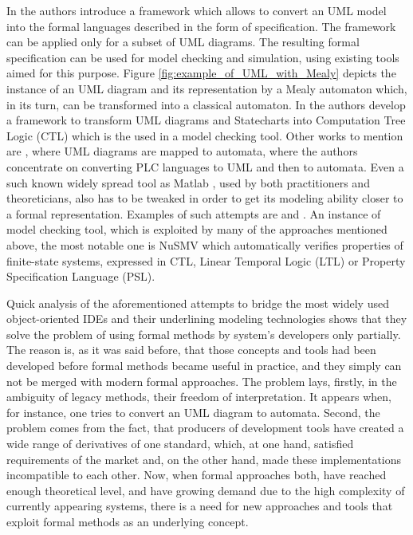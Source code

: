 In \cite{mcumber_general_2001} the authors introduce a framework which allows to
convert an UML model into the formal languages described in the form of
specification. The framework can be applied only for a subset of UML diagrams.
The resulting formal specification can be used for model checking and
simulation, using existing tools aimed for this purpose. Figure
\ref{fig:example_of_UML_with_Mealy} depicts the instance of an UML diagram and
its representation by a Mealy automaton which, in its turn, can be transformed
into a classical automaton. In \cite{bonfe_design_2003} the authors develop a
framework to transform UML diagrams and Statecharts into Computation Tree Logic
(CTL) which is the used in a model checking tool.
Other works to mention are \cite{dong_model_2001}, where UML diagrams are mapped
to automata, \cite{frey_re-engineering_2004} where the authors concentrate on
converting PLC languages to UML and then to automata. Even a such known widely
spread tool as Matlab \cite{matlab}, used by both practitioners and
theoreticians, also has to be tweaked in order to get its modeling ability
closer to a formal representation. Examples of such attempts are
\cite{ray_automated_2007} and \cite{li_stateflow_2011}. An instance of model
checking tool, which is exploited by many of the approaches mentioned above, the
most notable one is NuSMV \cite{nusmv} which automatically verifies properties
of finite-state systems, expressed in CTL, Linear Temporal Logic (LTL) or
Property Specification Language (PSL).

Quick analysis of the aforementioned attempts to bridge the most widely
used object-oriented IDEs and their underlining modeling technologies shows that
they solve the problem of using formal methods by system's developers
only partially. The reason is, as it was said before, that those concepts
and tools had been developed before formal methods became useful in practice,
and they simply can not be merged with modern formal approaches. The problem
lays, firstly, in the ambiguity of legacy methods, their freedom of
interpretation. It appears when, for instance, one tries to convert an UML
diagram to automata. Second, the problem comes from the fact, that producers of
development tools have created a wide range of derivatives of one standard,
which, at one hand, satisfied requirements of the market and, on the other hand,
made these implementations incompatible to each other. Now, when formal
approaches both, have reached enough theoretical level, and have growing demand
due to the high complexity of currently appearing systems, there is a need for
new approaches and tools that exploit formal methods as an underlying concept.

